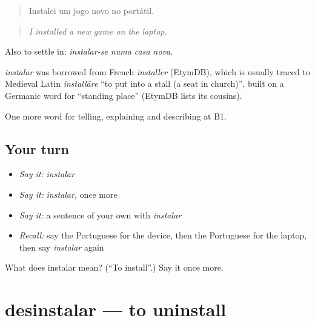 \begin{quote}
Instalei um jogo novo no portátil.
\end{quote}

\begin{quote}
\emph{I installed a new game on the laptop.}
\end{quote}

Also to settle in: \emph{instalar-se numa casa nova}.

\begin{cousinweb}
\emph{instalar} was borrowed from French \emph{installer} (EtymDB), which is usually traced to Medieval Latin \emph{installāre} \textquotedblleft{}to put into a stall (a seat in church)\textquotedblright{}, built on a Germanic word for \textquotedblleft{}standing place\textquotedblright{} (EtymDB lists its cousins).
\end{cousinweb}

\begin{grammarlens}[title={What you've built}]
One more word for telling, explaining and describing at B1.
\end{grammarlens}

\subsection*{Your turn}
\begin{itemize}
\raggedright
  \item \emph{Say it:} \emph{instalar}
  \item \emph{Say it:} \emph{instalar}, once more
  \item \emph{Say it:} a sentence of your own with \emph{instalar}
  \item \emph{Recall:} say the Portuguese for the device, then the Portuguese for the laptop, then say \emph{instalar} again
\end{itemize}

\begin{tcolorbox}[breakable,colback=teal!4,colframe=teal!35!black,title={Before you move on}]
What does instalar mean? (\textquotedblleft{}To install\textquotedblright{}.) Say it once more.
\end{tcolorbox}
\section[desinstalar]{desinstalar — to uninstall}

\label{lesson:PT-C397-desinstalar}



